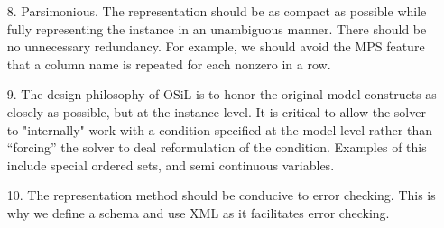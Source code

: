 \documentclass[11pt]{amsart}
\begin{document}
\begin{itemize}
\item[8.]  Parsimonious. The representation should be as compact as possible while fully representing the instance in an unambiguous manner.  There should be no unnecessary redundancy. For example, we should avoid the MPS feature that a column name is repeated for each nonzero in a row.

\item[9.]  The design philosophy of OSiL is to honor the original model constructs as closely as possible, but at the instance level.  It is critical to  allow the solver to "internally"  work with a  condition specified at the model level  rather than ``forcing'' the solver to  deal reformulation of the condition. Examples of this include special ordered sets, and semi continuous variables.  

\item[10.] The representation method should be conducive to error checking. This is why we define a schema and use XML as it facilitates error checking. 



\end{itemize}
\end{document}
